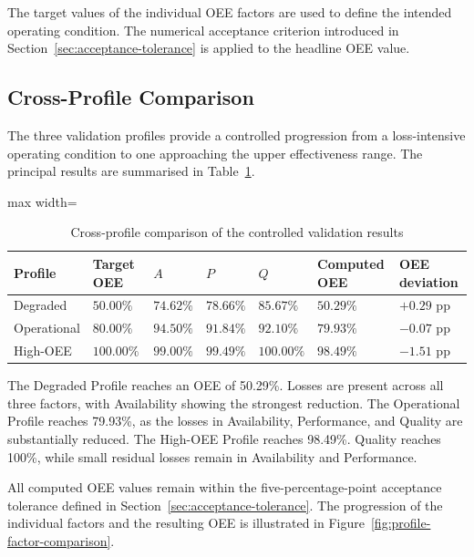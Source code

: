 The target values of the individual OEE factors are used to define the intended operating
condition. The numerical acceptance criterion introduced in Section~\ref{sec:acceptance-tolerance} is applied to the
headline OEE value.

\subsection{Cross-Profile Comparison}
\label{subsec:cross-profile-comparison}

The three validation profiles provide a controlled progression from a loss-intensive operating
condition to one approaching the upper effectiveness range. The principal results are summarised
in Table~\ref{tab:cross-profile-oee-comparison}.

\begin{table}[htbp]
\small
\renewcommand{\arraystretch}{1.15}
\centering
\caption{Cross-profile comparison of the controlled validation results}
\label{tab:cross-profile-oee-comparison}
\begin{adjustbox}{max width=\textwidth}
\begin{tabular}{|p{2.7cm}|p{1.8cm}|p{1.9cm}|p{1.9cm}|p{1.9cm}|p{2.0cm}|p{2.0cm}|}
\hline
\textbf{Profile} &
\textbf{Target OEE} &
\textbf{$A$} &
\textbf{$P$} &
\textbf{$Q$} &
\textbf{Computed OEE} &
\textbf{OEE deviation} \\
\hline
Degraded &
$50.00\%$ &
$74.62\%$ &
$78.66\%$ &
$85.67\%$ &
$\mathbf{50.29\%}$ &
$+0.29$ pp \\
\hline
Operational &
$80.00\%$ &
$94.50\%$ &
$91.84\%$ &
$92.10\%$ &
$\mathbf{79.93\%}$ &
$-0.07$ pp \\
\hline
High-OEE &
$100.00\%$ &
$99.00\%$ &
$99.49\%$ &
$100.00\%$ &
$\mathbf{98.49\%}$ &
$-1.51$ pp \\
\hline
\end{tabular}
\end{adjustbox}
\end{table}
The Degraded Profile reaches an OEE of 50.29\%. Losses are present across all three factors, with Availability showing the strongest reduction. The Operational Profile reaches 79.93\%, as the losses in Availability, Performance, and Quality are substantially reduced. The High-OEE Profile reaches 98.49\%. Quality reaches 100\%, while small residual losses remain in Availability and Performance.

All computed OEE values remain within the five-percentage-point acceptance tolerance defined in Section~\ref{sec:acceptance-tolerance}. The progression of the individual factors and the resulting OEE is illustrated in Figure~\ref{fig:profile-factor-comparison}.

